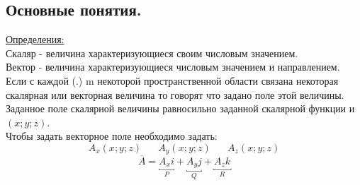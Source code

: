 \documentclass[12pt]{article}
\begin{document}
  \subsection{Основные понятия.}
  \underline{Определения: }\\
  Скаляр - величина характеризующиеся своим числовым значением.\\
  Вектор - величина характеризующиеся числовым значением и направлением.\\
  Если с каждой (.) m некоторой пространственной области связана некоторая скалярная или векторная величина то говорят что
  задано поле этой величины. Заданное поле скалярной величины равносильно заданной скалярной функции и $(x;y;z)$.\\
  Чтобы задать векторное поле необходимо задать:
  \[A_x(x;y;z) \hspace{20pt} A_y(x;y;z) \hspace{20pt} A_z(x;y;z)\]
  \[\overline{A}=\underbracket{A_x i}_{P}+\underbracket{A_y j}_{Q}+\underbracket{A_z k}_{R}\]
  
\end{document}
